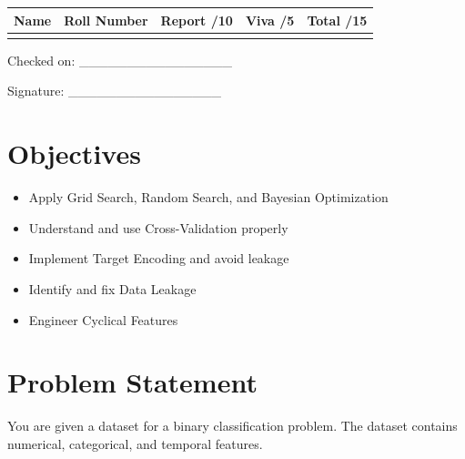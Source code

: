 \documentclass[12pt,a4paper]{article}
\begin{document}
\renewcommand{\arraystretch}{2.0}
\begin{tabularx}{\textwidth}{|Y|Y|Y|Y|Y|}
\hline
\textbf{Name} & \textbf{Roll Number} & \textbf{Report /10} & \textbf{Viva /5} & \textbf{Total /15} \\
\hline
 & & & & \\
\hline
\end{tabularx}
\renewcommand{\arraystretch}{1.0}

\vspace{12pt}

\begin{flushright}
Checked on: \_\_\_\_\_\_\_\_\_\_\_\_\_\_\_\_

\vspace{6pt}
Signature: \_\_\_\_\_\_\_\_\_\_\_\_\_\_\_\_
\end{flushright}

\newpage


\section*{Objectives}

\begin{itemize}
\item Apply Grid Search, Random Search, and Bayesian Optimization
\item Understand and use Cross-Validation properly
\item Implement Target Encoding and avoid leakage
\item Identify and fix Data Leakage
\item Engineer Cyclical Features
\end{itemize}


\section*{Problem Statement}

You are given a dataset for a binary classification problem. The dataset contains numerical, categorical, and temporal features.
\end{document}
